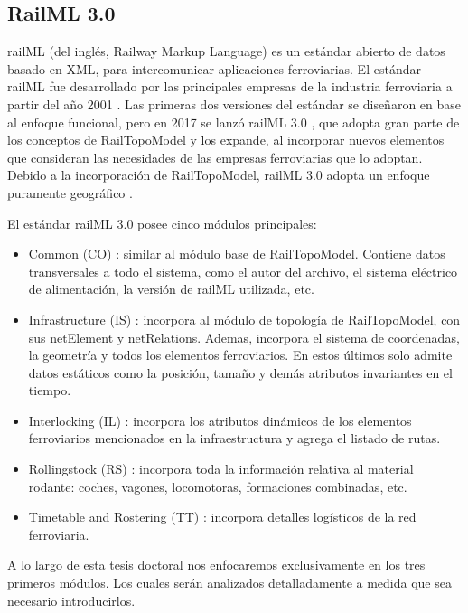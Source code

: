 \subsection{RailML 3.0}

	railML \cite{RAILML_0,Paper_107,Paper_112,Paper_150,Paper_159} (del inglés, Railway Markup Language) es un estándar abierto de datos basado en XML, para intercomunicar aplicaciones ferroviarias. El estándar railML fue desarrollado por las principales empresas de la industria ferroviaria a partir del año 2001 \cite{Paper_159}. Las primeras dos versiones del estándar se diseñaron en base al enfoque funcional, pero en 2017 se lanzó railML 3.0 \cite{RAILML_0,Paper_146,Paper_150}, que adopta gran parte de los conceptos de RailTopoModel y los expande, al incorporar nuevos elementos que consideran las necesidades de las empresas ferroviarias que lo adoptan. Debido a la incorporación de RailTopoModel, railML 3.0 adopta un enfoque puramente geográfico \cite{Paper_150}.
	
	El estándar railML 3.0 posee cinco módulos principales:
	

    \begin{itemize}
        \item Common (CO) \cite{RAILML_CO}: similar al módulo base de RailTopoModel. Contiene datos transversales a todo el sistema, como el autor del archivo, el sistema eléctrico de alimentación, la versión de railML utilizada, etc.
        \item Infrastructure (IS) \cite{RAILML_IS}: incorpora al módulo de topología de RailTopoModel, con sus netElement y netRelations. Ademas, incorpora el sistema de coordenadas, la geometría y todos los elementos ferroviarios. En estos últimos solo admite datos estáticos como la posición, tamaño y demás atributos invariantes en el tiempo.
        \item Interlocking (IL) \cite{RAILML_IL}: incorpora los atributos dinámicos de los elementos ferroviarios mencionados en la infraestructura y agrega el listado de rutas.
        \item Rollingstock (RS) \cite{RAILML_RS}: incorpora toda la información relativa al material rodante: coches, vagones, locomotoras, formaciones combinadas, etc.
        \item Timetable and Rostering (TT) \cite{RAILML_TT}: incorpora detalles logísticos de la red ferroviaria.
    \end{itemize}

    A lo largo de esta tesis doctoral nos enfocaremos exclusivamente en los tres primeros módulos. Los cuales serán analizados detalladamente a medida que sea necesario introducirlos.